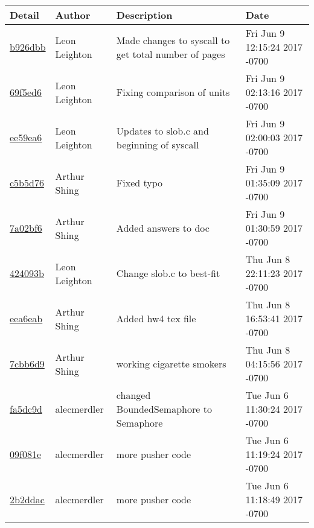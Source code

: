 \begin{tabular}{l l l l}\textbf{Detail} & \textbf{Author} & \textbf{Description} & \textbf{Date}\\\hline
\href{https://github.com/alecmerdler/cs-444-group-119/commit/b926dbbf8686c2cd06d0a6a08ef449f8da4a1d3b}{b926dbb} & Leon Leighton & Made changes to syscall to get total number of pages & Fri Jun 9 12:15:24 2017 -0700\\\hline
\href{https://github.com/alecmerdler/cs-444-group-119/commit/69f5ed6b069d281e822cf1e43773cb847eb869ac}{69f5ed6} & Leon Leighton & Fixing comparison of units & Fri Jun 9 02:13:16 2017 -0700\\\hline
\href{https://github.com/alecmerdler/cs-444-group-119/commit/ee59ea6a380cd3042481a5bb41c9cfc9c06d01c7}{ee59ea6} & Leon Leighton & Updates to slob.c and beginning of syscall & Fri Jun 9 02:00:03 2017 -0700\\\hline
\href{https://github.com/alecmerdler/cs-444-group-119/commit/c5b5d76787fd467cb08813cdd5c84f8109bc9f5b}{c5b5d76} & Arthur Shing & Fixed typo & Fri Jun 9 01:35:09 2017 -0700\\\hline
\href{https://github.com/alecmerdler/cs-444-group-119/commit/7a02bf6ba44b86597443b726e837b34e8121e113}{7a02bf6} & Arthur Shing & Added answers to doc & Fri Jun 9 01:30:59 2017 -0700\\\hline
\href{https://github.com/alecmerdler/cs-444-group-119/commit/424093b9831ffbbcce981e57958bbab72e65e54e}{424093b} & Leon Leighton & Change slob.c to best-fit & Thu Jun 8 22:11:23 2017 -0700\\\hline
\href{https://github.com/alecmerdler/cs-444-group-119/commit/eea6eab255a3a63eacbd486315f8270b52d2e080}{eea6eab} & Arthur Shing & Added hw4 tex file & Thu Jun 8 16:53:41 2017 -0700\\\hline
\href{https://github.com/alecmerdler/cs-444-group-119/commit/7cbb6d989006f504db0136fea5da32d500147e53}{7cbb6d9} & Arthur Shing & working cigarette smokers & Thu Jun 8 04:15:56 2017 -0700\\\hline
\href{https://github.com/alecmerdler/cs-444-group-119/commit/fa5dc9df5a990f40c8a55aea751347c8a07ace96}{fa5dc9d} & alecmerdler & changed BoundedSemaphore to Semaphore & Tue Jun 6 11:30:24 2017 -0700\\\hline
\href{https://github.com/alecmerdler/cs-444-group-119/commit/09f081eba62c5193144d3c17234b4bfa527d36de}{09f081e} & alecmerdler & more pusher code & Tue Jun 6 11:19:24 2017 -0700\\\hline
\href{https://github.com/alecmerdler/cs-444-group-119/commit/2b2ddac696610404faf0a860808d26c4415ad19e}{2b2ddac} & alecmerdler & more pusher code & Tue Jun 6 11:18:49 2017 -0700\\\hline

\end{tabular}
